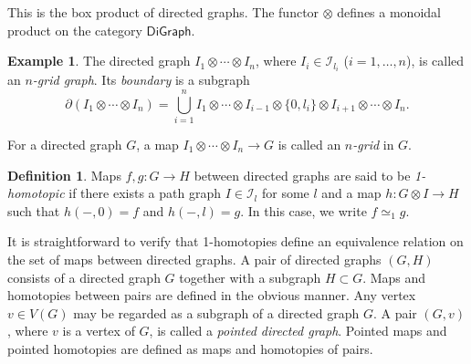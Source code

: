 \documentclass[oneside, 12pt]{amsart}
\numberwithin{equation}{section}
\theoremstyle{plain}
\theoremstyle{definition}
\newtheorem{definition}[theorem]{Definition}
\newtheorem{example}[theorem]{Example}
\theoremstyle{remark}
\begin{document}
	
	
	This is the box product of directed graphs. The functor $\otimes$ defines a monoidal product on the category $\mathsf{DiGraph}$.
	
	
	
	\begin{example}
		The directed graph $I_1\otimes\cdots\otimes I_n$, where $I_i\in\mathcal{I}_{l_i}$ ($i=1,\ldots,n$), is called an \emph{$n$-grid graph}. Its \emph{boundary} is a subgraph
		\[
		\partial(I_1\otimes\cdots\otimes I_n)=\bigcup_{i=1}^nI_1\otimes\cdots\otimes I_{i-1}\otimes\{0,l_i\}\otimes I_{i+1}\otimes\cdots\otimes I_n.
		\]
	\end{example}
	For a directed graph $G$, a map $I_1\otimes\cdots\otimes I_n\to G$ is called an \emph{$n$-grid} in $G$.
	
	
	\begin{definition}
		\label{homotopy digraph def}
		Maps $f,g\colon G\to H$ between directed graphs are said to be \emph{1-homotopic} if there exists a path graph $I\in\mathcal{I}_l$ for some $l$ and a map $h\colon G\otimes I\to H$ such that $h(-,0)=f$ and $h(-,l)=g$. In this case, we write $f\simeq_1 g$.
	\end{definition}
	It is straightforward to verify that 1-homotopies define an equivalence relation on the set of maps between directed graphs. A pair of directed graphs $(G,H)$ consists of a directed graph $G$ together with a subgraph $H\subset G$. Maps and homotopies between pairs are defined in the obvious manner. Any vertex $v\in V(G)$ may be regarded as a subgraph of a directed graph $G$. A pair $(G,v)$, where $v$ is a vertex of $G$, is called a \emph{pointed directed graph}. Pointed maps and pointed homotopies are defined as maps and homotopies of pairs.
\end{document}
